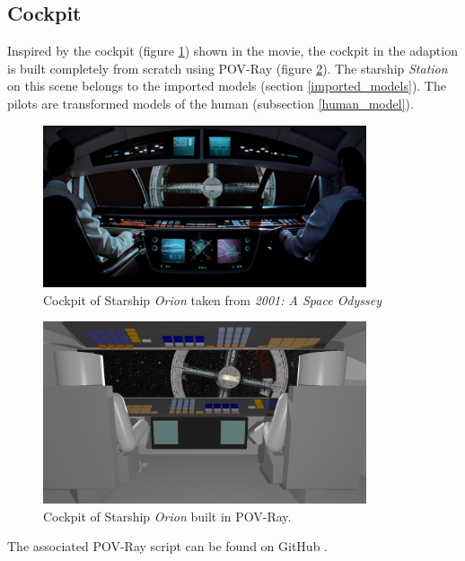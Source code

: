 \subsection{Cockpit} \label{cockpit_model}
Inspired by the cockpit (figure \ref{cockpit_original}) shown in the movie, the cockpit in the adaption  is built completely from scratch using POV-Ray (figure \ref{cockpit_povray}). The starship \textit{Station} on this scene belongs to the imported models (section \ref{imported_models}).
The pilots are transformed models of the human (subsection \ref{human_model}).

\begin{figure}[ht]
	\centering
	\includegraphics[width=0.85\textwidth]{images/original_cockpit.png}
	\caption{Cockpit of Starship \textit{Orion} taken from \textit{2001: A Space Odyssey}}
	\label{cockpit_original}
\end{figure}

\begin{figure}[ht]
	\centering
	\includegraphics[width=0.85\textwidth]{images/scene19587.png}
	\caption{Cockpit of Starship \textit{Orion} built in POV-Ray.}
	\label{cockpit_povray}
\end{figure}

The associated POV-Ray script can be found on GitHub \cite{Quving}.

\newpage
